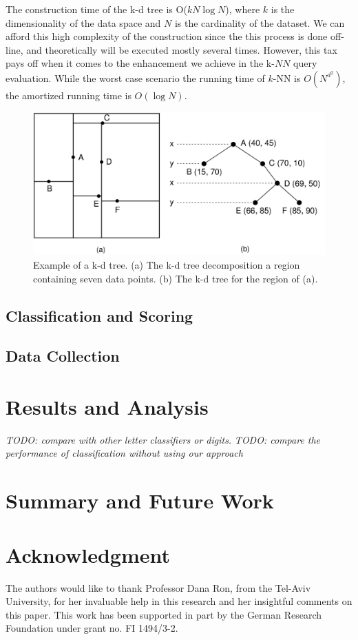 \documentclass[10pt, conference, compsocconf]{IEEEtran}
\theoremstyle{definition}
\begin{document}
\iftoggle{edit-mode}{\hspace{0pt}\marginpar{Expected time complexity}}{}
The construction time of the k-d tree is O($k N \log N$), where $k$ is the dimensionality of the data space and $N$ is the cardinality of the dataset. We can afford this high complexity of the construction since the this process is done off-line, and theoretically will be executed mostly several times. However, this tax pays off when it comes to the enhancement we achieve in the k-$NN$ query evaluation. While the worst case scenario the running time of $k$-NN is $O(N^{d^2})$, the amortized running time is $O(\log N)$.
\begin{figure}
\centering
\includegraphics[width=0.7\columnwidth]{./figures/kd_tree}       
\caption{Example of a k-d tree. (a) The k-d tree decomposition  a region containing seven data points. (b) The k-d tree for the region of (a).}
\label{fig:kd_tree}
\end{figure}


\subsection{Classification and Scoring}

\subsection{Data Collection}

\section{Results and Analysis}

\emph{TODO: compare with other letter classifiers or digits.}
\emph{TODO: compare the performance of classification without using our approach}

\section{Summary and Future Work}

\section*{Acknowledgment}
The authors would like to thank Professor Dana Ron, from the Tel-Aviv University, for her invaluable help in this research and her insightful comments on this paper. This work has been supported in part by the German Research Foundation under grant no. FI 1494/3-2.



\end{document}
